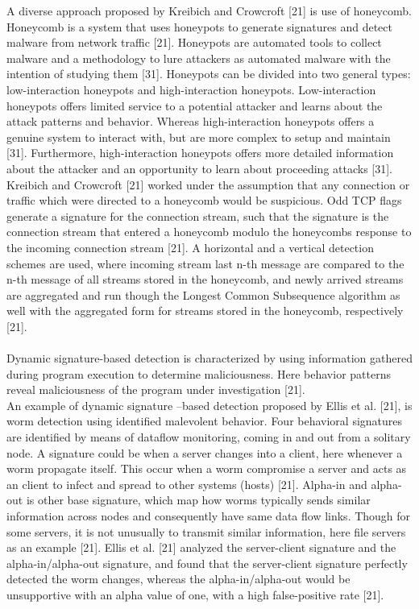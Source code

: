\documentclass[12pt]{article} %
\begin{document}
A diverse approach proposed by Kreibich and Crowcroft [21] is use of honeycomb. Honeycomb is a system that uses honeypots to generate signatures and detect malware from network traffic [21]. Honeypots are automated tools to collect malware and a methodology to lure attackers as automated malware with the intention of studying them [31]. Honeypots can be divided into two general types: low-interaction honeypots and high-interaction honeypots. Low-interaction honeypots offers limited service to a potential attacker and learns about the attack patterns and behavior. Whereas high-interaction honeypots offers a genuine system to interact with, but are more complex to setup and maintain [31]. Furthermore, high-interaction honeypots offers more detailed information about the attacker and an opportunity to learn about proceeding attacks [31]. Kreibich and Crowcroft [21] worked under the assumption that any connection or traffic which were directed to a honeycomb would be suspicious. Odd TCP flags generate a signature for the connection stream, such that the signature is the connection stream that entered a honeycomb modulo the honeycombs response to the incoming connection stream [21]. A horizontal and a vertical detection schemes are used, where incoming stream last n-th message are compared to the n-th message of all streams stored in the honeycomb, and newly arrived streams are aggregated and run though the Longest Common Subsequence algorithm as well with the aggregated form for streams stored in the honeycomb, respectively [21]. \\ \\
Dynamic signature-based detection is characterized by using information gathered during program execution to determine maliciousness. Here behavior patterns reveal maliciousness of the program under investigation [21]. \\
An example of dynamic signature –based detection proposed by Ellis et al. [21], is worm detection using identified malevolent behavior. Four behavioral signatures are identified by means of dataflow monitoring, coming in and out from a solitary node. A signature could be when a server changes into a client, here whenever a worm propagate itself. This occur when a worm compromise a server and acts as an client to infect and spread to other systems (hosts) [21]. Alpha-in and alpha-out is other base signature, which map how worms typically sends similar information across nodes and consequently have same data flow links. Though for some servers, it is not unusually to transmit similar information, here file servers as an example [21]. Ellis et al. [21] analyzed the server-client signature and the alpha-in/alpha-out signature, and found that the server-client signature perfectly detected the worm changes, whereas the alpha-in/alpha-out would be unsupportive with an alpha value of one, with a high false-positive rate [21]. \\ \\
\end{document}
